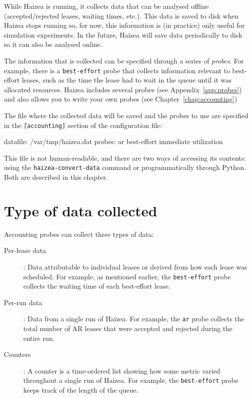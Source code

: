 While Haizea is running, it collects data that can be analysed offline (accepted/rejected leases, waiting times, etc.). This data is saved to disk when Haizea stops running so, for now, this information is (in practice) only useful for simulation experiments. In the future, Haizea will save data periodically to disk so it can also be analysed online.

The information that is collected can be specified through a series of \emph{probes}. For example, there is a \texttt{best-effort} probe that collects information relevant to best-effort leases, such as the time the lease had to wait in the queue until it was allocated resources. Haizea includes several probes (see Appendix~\ref{app:probes}) and also allows you to write your own probes (see Chapter~\ref{chap:accounting})

The file where the collected data will be saved and the probes to use are specified in the \texttt{[accounting]} section of the configuration file:

\begin{wideshellverbatim}
[accounting]
datafile: /var/tmp/haizea.dat
probes: ar best-effort immediate utilization
\end{wideshellverbatim}

This file is not human-readable, and there are two ways of accessing its contents: using the \texttt{haizea-convert-data} command or programmatically through Python. Both are described in this chapter.

\section{Type of data collected}

Accounting probes can collect three types of data:

\begin{description}
\item[Per-lease data]: Data attributable to individual leases or derived from how each lease was scheduled. For example, as mentioned earlier, the \texttt{best-effort} probe collects the waiting time of each best-effort lease.
\item[Per-run data]: Data from a single run of Haizea. For example, the \texttt{ar} probe collects the total number of AR leases that were accepted and rejected during the entire run.
\item[Counters]: A counter is a time-ordered list showing how some metric varied throughout a single run of Haizea. For example, the \texttt{best-effort} probe keeps track of the length of the queue. 
\end{description}


